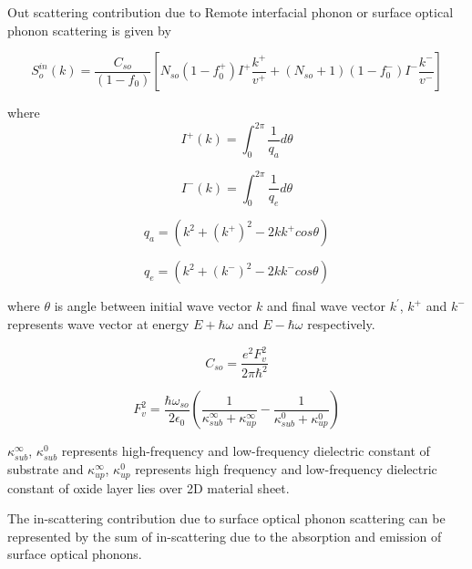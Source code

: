 \documentclass[12pt]{article}
\begin{document}
Out scattering contribution due to Remote interfacial phonon or surface optical phonon scattering is given by 

\begin{equation}
S_{o}^{in}(k) = \frac{C_{so}}{(1- f_{0})} [N_{so} (1 - f_{0}^+) I^+ \frac{k^+}{v^+}  + (N_{so}+1) (1 - f_{0}^-) I^- \frac{k^-}{v^-}]
\label{out_sc_so}
\end{equation}

where 
\begin{equation}
I^{+}(k) = \int_0^{2\pi} \frac{1}{q_{a}} d\theta 
\label{J_plus_so}
\end{equation}

\begin{equation}
I^{-}(k) = \int_0^{2\pi} \frac{1}{q_{e}} d\theta 
\label{J_minus_so}
\end{equation}



\begin{equation}
q_{a} = \left( k^2 + \left( k^{+}\right)^2 - 2k k^{+} cos \theta \right)
\label{q_ab_so}
\end{equation}

\begin{equation}
q_{e} = \left( k^2 + \left( k^{-}\right)^2 - 2k k^{-} cos \theta \right)
\label{q_em_so}
\end{equation}

where $\theta $ is angle between initial wave vector $k$ and final wave vector $k^{'}$, $k^+$ and $k^-$ represents wave vector at energy $E+ \hbar \omega$ and $E- \hbar \omega$ respectively.

\begin{equation}
C_{so} = \frac{e^2 F_{v}^2}{2 \pi \hbar^2}  
\label{so_const}
\end{equation}

\begin{equation}
F_v^2 = \frac{\hbar \omega_{so}}{2 \epsilon_0 } \left( \frac{1}{\kappa_{sub}^{\infty} + \kappa_{up}^{\infty}} - \frac{1}{\kappa_{sub}^{0} + \kappa_{up}^{0}} \right)
\label{so_const}
\end{equation}

$\kappa_{sub}^{\infty}$, $\kappa_{sub}^{0}$ represents high-frequency and low-frequency dielectric constant of substrate and $\kappa_{up}^{\infty}$, $\kappa_{up}^{0}$ represents high frequency and low-frequency dielectric constant of oxide layer lies over 2D material sheet.
 
The in-scattering contribution due to surface optical phonon scattering can be represented by the sum of in-scattering due to the absorption and emission of surface optical phonons. 
\end{document}
